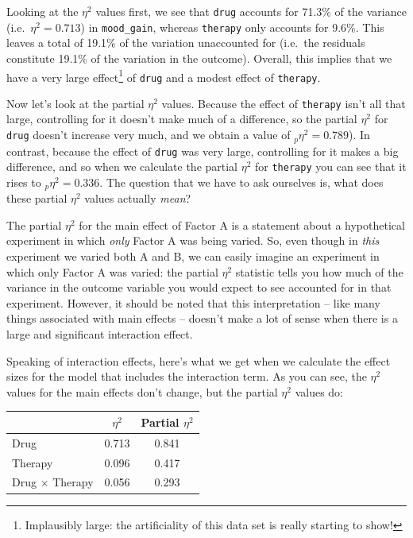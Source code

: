 \documentclass[
]{book}
\theoremstyle{definition}
\theoremstyle{definition}
\theoremstyle{definition}
\theoremstyle{definition}
\theoremstyle{remark}
\begin{document}
Looking at the \(\eta^2\) values first, we see that \texttt{drug} accounts for 71.3\% of the variance (i.e.~\(\eta^2 = 0.713\)) in \texttt{mood\_gain}, whereas \texttt{therapy} only accounts for 9.6\%. This leaves a total of 19.1\% of the variation unaccounted for (i.e.~the residuals constitute 19.1\% of the variation in the outcome). Overall, this implies that we have a very large effect\footnote{Implausibly large: the artificiality of this data set is really starting to show!} of \texttt{drug} and a modest effect of \texttt{therapy}.

Now let's look at the partial \(\eta^2\) values. Because the effect of \texttt{therapy} isn't all that large, controlling for it doesn't make much of a difference, so the partial \(\eta^2\) for \texttt{drug} doesn't increase very much, and we obtain a value of \(_p\eta^2 = 0.789\)). In contrast, because the effect of \texttt{drug} was very large, controlling for it makes a big difference, and so when we calculate the partial \(\eta^2\) for \texttt{therapy} you can see that it rises to \(_p\eta^2 = 0.336\). The question that we have to ask ourselves is, what does these partial \(\eta^2\) values actually \emph{mean}?

The partial \(\eta^2\) for the main effect of Factor A is a statement about a hypothetical experiment in which \emph{only} Factor A was being varied. So, even though in \emph{this} experiment we varied both A and B, we can easily imagine an experiment in which only Factor A was varied: the partial \(\eta^2\) statistic tells you how much of the variance in the outcome variable you would expect to see accounted for in that experiment. However, it should be noted that this interpretation -- like many things associated with main effects -- doesn't make a lot of sense when there is a large and significant interaction effect.

Speaking of interaction effects, here's what we get when we calculate the effect sizes for the model that includes the interaction term. As you can see, the \(\eta^2\) values for the main effects don't change, but the partial \(\eta^2\) values do:

\begin{longtable}[]{@{}lcc@{}}
\toprule()
& \(\eta^2\) & Partial \(\eta^2\) \\
\midrule()
\endhead
Drug & 0.713 & 0.841 \\
Therapy & 0.096 & 0.417 \\
Drug \(\times\) Therapy & 0.056 & 0.293 \\
\bottomrule()
\end{longtable}
\end{document}
